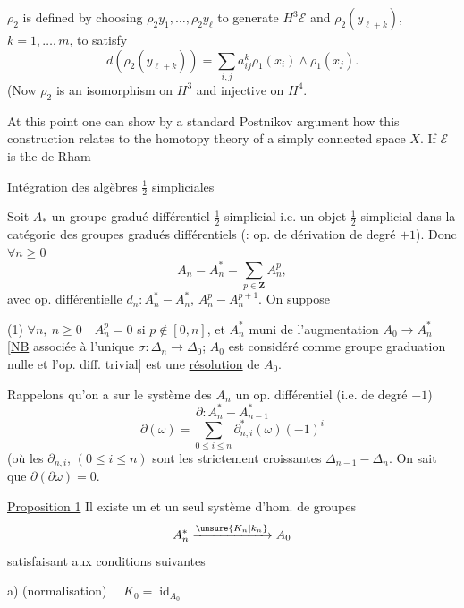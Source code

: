 $\rho_2$ is defined by choosing $\rho_2y_1,\ldots,\rho_2y_\ell$ to generate $H^3\mathcal E$ and $\rho_2(y_{\ell+k})$, $k=1,\ldots,m$, to satisfy
\[
d(\rho_2(y_{\ell+k}))=\sum_{i,j}a^k_{ij}\rho_1(x_i)\wedge\rho_1(x_j).
\]
(Now $\rho_2$ is an isomorphism on $H^3$ and injective on $H^4$.

At this point one can show by a standard Postnikov argument how this construction relates to the homotopy theory of a simply connected space $X$. If $\mathcal E$ is the de Rham

\uline{Intégration des algèbres $\frac12$ simpliciales}

Soit $A_*$ un groupe gradué différentiel $\frac12$ simplicial
i.e. un objet $\frac12$ simplicial dans la catégorie des groupes
gradués différentiels (: op. de dérivation de degré $+1$).
 Donc $\forall n\geq0$
\[
A_n=A_n^*=\sum_{p\in\mathbf Z}A_n^p,
\]
avec op. différentielle
$d_n:A_n^*\mathbin{-}A_n^*$,
$A_n^p\mathbin{-}A_n^{p+1}$.
On suppose

(1) $\forall n,\ n\geq0\quad A_n^p=0$ si $p\notin[0,n]$,
et  $A_n^*$ muni
de l'augmentation 
$A_0\longrightarrow A_n^*$
[\uline{NB} associée à l'unique $\sigma:\Delta_n\longrightarrow\Delta_0$;
$A_0$ est considéré comme groupe 
graduation nulle et l'op. diff. trivial]
est une \uline{résolution} de $A_0$.

Rappelons qu'on a sur le système des $A_n$ un op.
différentiel (i.e. de degré $-1$)
\[
\partial:A_n^*\mathbin{-}A_{n-1}^*
\]
\[
\partial(\omega)=\sum_{0\leq i\leq n}\partial_{n,i}^*(\omega)(-1)^i
\]
(où les $\partial_{n,i}$, $(0\leq i\leq n)$ sont les 
strictement croissantes $\Delta_{n-1}\mathbin{-}\Delta_n$.
On sait que $\partial(\partial\omega)=0$.

\uline{Proposition 1} Il existe un et un seul système d'hom.
de groupes
\[
A_n^*\xrightarrow{\unsure{K_n|k_n}}A_0
\]
satisfaisant aux conditions suivantes

a) (normalisation) $\quad K_0=\operatorname{id}_{A_0}$

